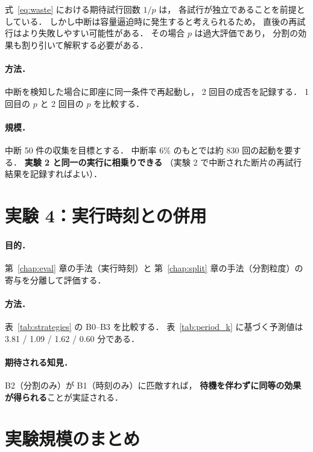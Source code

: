 \documentclass[11pt,a4paper]{ltjsreport}
\begin{document}
式~\eqref{eq:waste} における期待試行回数 $1/p$ は，
各試行が独立であることを前提としている．
しかし中断は容量逼迫時に発生すると考えられるため，
直後の再試行はより失敗しやすい可能性がある．
その場合 $p$ は過大評価であり，
分割の効果も割り引いて解釈する必要がある．

\paragraph{方法．}
中断を検知した場合に即座に同一条件で再起動し，
2 回目の成否を記録する．
1 回目の $p$ と 2 回目の $p$ を比較する．

\paragraph{規模．}
中断 50 件の収集を目標とする．
中断率 6\% のもとでは約 830 回の起動を要する．
\textbf{実験 2 と同一の実行に相乗りできる}
（実験 2 で中断された断片の再試行結果を記録すればよい）．

\section{実験 4：実行時刻との併用}

\paragraph{目的．}
第~\ref{chap:eval} 章の手法（実行時刻）と
第~\ref{chap:split} 章の手法（分割粒度）の
寄与を分離して評価する．

\paragraph{方法．}
表~\ref{tab:strategies} の B0--B3 を比較する．
表~\ref{tab:period_k} に基づく予測値は
3.81 / 1.09 / 1.62 / 0.60 分である．

\paragraph{期待される知見．}
B2（分割のみ）が B1（時刻のみ）に匹敵すれば，
\textbf{待機を伴わずに同等の効果が得られる}ことが実証される．

\section{実験規模のまとめ}
\end{document}
